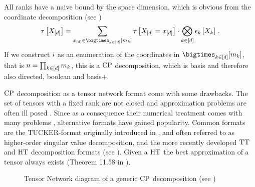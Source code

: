 All ranks have a naive bound by the space dimension, which is obvious from the coordinate decomposition (see )
\begin{align*}
    \hypercorewith
    = \sum_{\shortcatindices\in\facstates} \hypercoreat{\indexedshortcatvariables} \cdot \bigotimes_{\catenumeratorin} \onehotmapofat{\catenumerator}{\catvariableof{\catenumerator}} \, .
\end{align*}
If we construct $i$ as an enumeration of the coordinates in $\facstates$, that is $n=\prod_{k\in[d]}m_{k}$, this is a $\mathrm{CP}$ decomposition, which is basis and therefore also directed, boolean and basis+.

%
$\mathrm{CP}$ decomposition as a tensor network format come with some drawbacks.
The set of tensors with a fixed rank are not closed \cite{beylkin_algorithms_2005} and approximation problems are often ill posed \cite{de_silva_tensor_2008}.
Since as a consequence their numerical treatment comes with many problems \cite{espig_variational_2012}, alternative formats have gained popularity.
Common formats are the $\mathrm{TUCKER}$-format originally introduced in \cite{hitchcock_expression_1927}, and often referred to as higher-order singular value decomposition, and the more recently developed $\mathrm{TT}$ and $\mathrm{HT}$ decomposition formats (see ).
Given a $\mathrm{HT}$ the best approximation of a tensor always exists (Theorem 11.58 in \cite{hackbusch_tensor_2012}).



\begin{figure}[t]
    \begin{center}
        
    \end{center}
    \caption{Tensor Network diagram of a generic $\mathrm{CP}$ decomposition (see )}
\end{figure}


